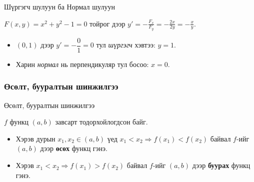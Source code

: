 \begin{frame}[allowframebreaks]{Шүргэгч шулуун ба Нормал шулуун}
\begin{example}
$F(x,y)=x^2+y^2-1=0$ тойрог дээр $\displaystyle y'=-\frac{F_x}{F_y}=-\frac{2x}{2y}=-\frac{x}{y}$.
\begin{itemize}
  \item $(0,1)$ дээр $y'=-\dfrac{0}{1}=0$ тул \emph{шүргэгч} хэвтээ: \;\; $\boxed{y=1}$.
  \item Харин \emph{нормал} нь перпендикуляр тул босоо: \;\; $\boxed{x=0}$.
\end{itemize}

\medskip
\begin{center}
\begin{fitbox}\end{fitbox}
\end{center}
\end{example}
\end{frame}

\subsubsection{Өсөлт, бууралтын шинжилгээ}
\begin{frame}[allowframebreaks]{Өсөлт, бууралтын шинжилгээ}
\begin{definition}
$f$ функц $(a,b)$ завсарт тодорхойлогдсон байг. 
\begin{itemize}
  \item Хэрэв дурын $x_1,x_2\in(a,b)$ үед $x_1<x_2\Rightarrow f(x_1)<f(x_2)$ байвал $f$-ийг $(a,b)$ дээр \textbf{өсөх}  функц гэнэ.
  \item Хэрэв $x_1<x_2\Rightarrow f(x_1)>f(x_2)$ байвал $f$-ийг $(a,b)$ дээр \textbf{буурах} функц гэнэ.
\end{itemize}
\end{definition}
\end{frame}

